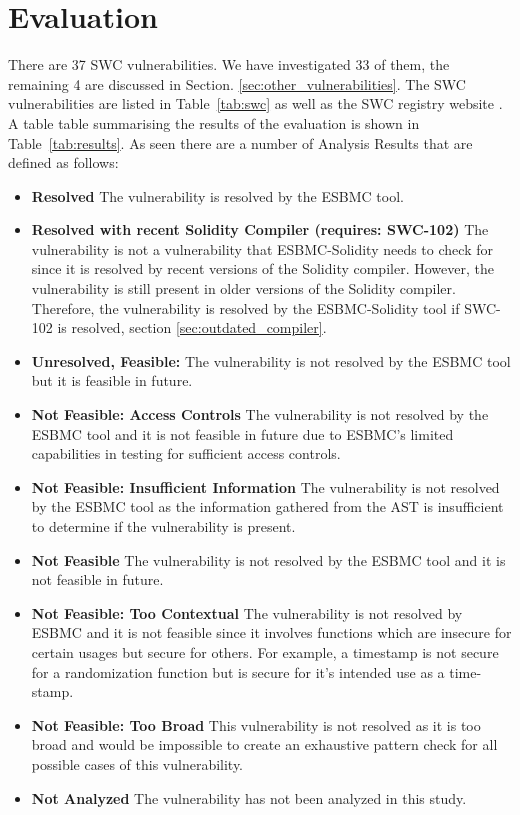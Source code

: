 \chapter{Evaluation}
\label{chapter:evaluation}

There are 37 SWC vulnerabilities. We have investigated 33 of them, the remaining 4 are discussed in Section. \ref{sec:other_vulnerabilities}. The SWC vulnerabilities are listed in Table~\ref{tab:swc} as well as the SWC registry website \cite{swc}. A table table summarising the results of the evaluation is shown in Table~\ref{tab:results}.  As seen there are a number of Analysis Results that are defined as follows:

\begin{itemize}
    \item \textbf{Resolved} The vulnerability is resolved by the ESBMC tool.
    \item \textbf{Resolved with recent Solidity Compiler (requires: SWC-102)} The vulnerability is not a vulnerability that ESBMC-Solidity needs to check for since it is resolved by recent versions of the Solidity compiler. However, the vulnerability is still present in older versions of the Solidity compiler. Therefore, the vulnerability is resolved by the ESBMC-Solidity tool if SWC-102 is resolved, section \ref{sec:outdated_compiler}.
    \item \textbf{Unresolved, Feasible:} The vulnerability is not resolved by the ESBMC tool but it is feasible in future.
    \item \textbf{Not Feasible: Access Controls} The vulnerability is not resolved by the ESBMC tool and it is not feasible in future due to ESBMC's limited capabilities in testing for sufficient access controls.
    \item \textbf{Not Feasible: Insufficient Information} The vulnerability is not resolved by the ESBMC tool as the information gathered from the AST is insufficient to determine if the vulnerability is present.
    \item \textbf{Not Feasible} The vulnerability is not resolved by the ESBMC tool and it is not feasible in future.
    \item \textbf{Not Feasible: Too Contextual} The vulnerability is not resolved by ESBMC and it is not feasible since it involves functions which are insecure for certain usages but secure for others. For example, a timestamp is not secure for a randomization function but is secure for it's intended use as a time-stamp.
    \item \textbf{Not Feasible: Too Broad} This vulnerability is not resolved as it is too broad and would be impossible to create an exhaustive pattern check for all possible cases of this vulnerability.
    \item \textbf{Not Analyzed} The vulnerability has not been analyzed in this study.
\end{itemize}

